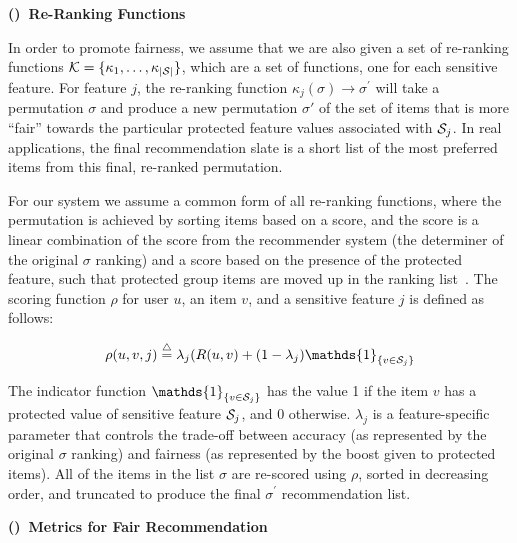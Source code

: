 \vspace{0.25cm}
\noindent \textbf{()~Re-Ranking Functions}
\vspace{0.25cm}

In order to promote fairness, we assume that we are also given a set of re-ranking functions $\mathcal{K} = \{\kappa_1, \ldots, \kappa_{|\mathcal{S}|}\}$, which are a set of functions, one for each sensitive feature. For feature $j$, the re-ranking function $\kappa_j(\sigma) \rightarrow \sigma^{\prime}$ will take a permutation $\sigma$ and produce a new permutation $\sigma'$ of the set of items that is more ``fair'' towards the particular protected feature values associated with $\mathcal{S}_j$. In real applications, the final recommendation slate is a short list of the most preferred items from this final, re-ranked permutation. 

For our system we assume a common form of all re-ranking functions, where the permutation is achieved by sorting items based on a score, and the score is a linear combination of the score from the recommender system (the determiner of the original $\sigma$ ranking) and a score based on the presence of the protected feature, such that protected group items are moved up in the ranking list~\cite{adomavicius2009improving}. The scoring function $\rho$ for user $u$, an item $v$, and a sensitive feature $j$ is defined as follows:

\begin{equation}
    \rho(u, v, j) \buildrel\triangle\over= \lambda_j  (R(u,v) + (1 - \lambda_j) \mathds{1}_{\{v \in \sensitive_j\}}
\end{equation}
\vspace{0.25cm}


\noindent The indicator function $\mathds{1}_{\{v \in \sensitive_j\}}$ has the value 1 if the item $v$ has a protected value of sensitive feature $\mathcal{S}_j$, and 0 otherwise. $\lambda_j$ is a feature-specific parameter that controls the trade-off between accuracy (as represented by the original $\sigma$ ranking) and fairness (as represented by the boost given to protected items). All of the items in the list $\sigma$ are re-scored using $\rho$, sorted in decreasing order, and truncated to produce the final $\sigma^{\prime}$ recommendation list.

\vspace{0.25cm}
\noindent \textbf{()~Metrics for Fair Recommendation}
\vspace{0.25cm}

